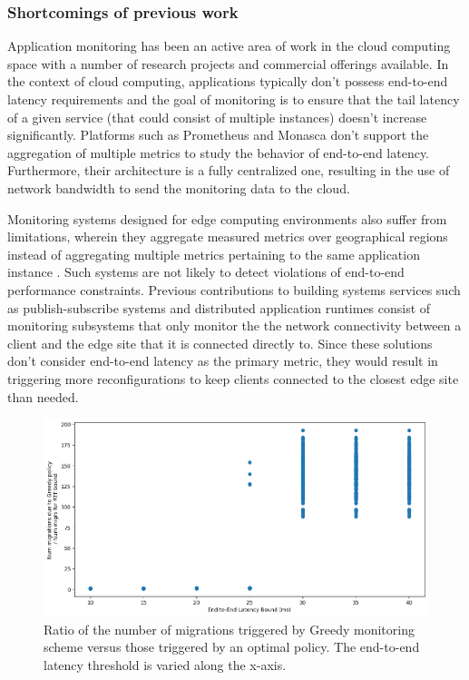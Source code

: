 \subsubsection{Shortcomings of previous work}
\par Application monitoring has been an active area of work in the cloud computing space with a number of research projects and commercial offerings available. In the context of cloud computing, applications typically don't possess end-to-end latency requirements and the goal of monitoring is to ensure that the tail latency of a given service (that could consist of multiple instances) doesn't increase significantly. Platforms such as Prometheus \cite{prometheus} and Monasca \cite{monasca} don't support the aggregation of multiple metrics to study the behavior of end-to-end latency. Furthermore, their architecture is a fully centralized one, resulting in the use of network bandwidth to send the monitoring data to the cloud.
\par Monitoring systems designed for edge computing environments also suffer from limitations, wherein they aggregate measured metrics over geographical regions instead of aggregating multiple metrics pertaining to the same application instance \cite{fmone, gonccalves2021dynamic}. Such systems are not likely to detect violations of end-to-end performance constraints. Previous contributions to building systems services such as publish-subscribe systems \cite{emma} and distributed application runtimes \cite{foglets} consist of monitoring subsystems that only monitor the the network connectivity between a client and the edge site that it is connected directly to. Since these solutions don't consider end-to-end latency as the primary metric, they would result in triggering more reconfigurations to keep clients connected to the closest edge site than needed.
\begin{figure}
\centering
\includegraphics[width=0.75\linewidth]{figures/mechanisms/monitoring/migrations_count.png}
\caption{Ratio of the number of migrations triggered by Greedy monitoring scheme versus those triggered by an optimal policy. The end-to-end latency threshold is varied along the x-axis.}
\label{fig:migration_count}
\end{figure}
